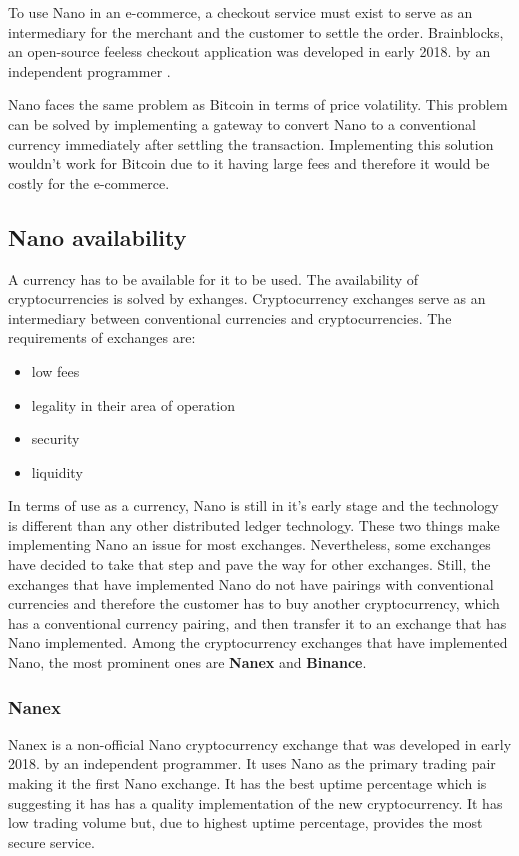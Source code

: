 \documentclass{ferseminar}
\begin{document}
To use Nano in an e-commerce, a checkout service must exist to serve as an intermediary for the merchant and the customer to settle the order. Brainblocks, an open-source feeless checkout application was developed in early 2018. by an independent programmer \cite{Brainblocks}.

Nano faces the same problem as Bitcoin in terms of price volatility. This problem can be solved by implementing a gateway to convert Nano to a conventional currency immediately after settling the transaction. Implementing this solution wouldn't work for Bitcoin due to it having large fees and therefore it would be costly for the e-commerce. 
\subsection{Nano availability}

A currency has to be available for it to be used. The availability of cryptocurrencies is solved by exhanges. Cryptocurrency exchanges serve as an intermediary between conventional currencies and cryptocurrencies. The requirements of exchanges are:
\begin{itemize}
	\item low fees
	\item legality in their area of operation
	\item security
	\item liquidity
\end{itemize}

In terms of use as a currency, Nano is still in it's early stage and the technology is different than any other distributed ledger technology. These two things make implementing Nano an issue for most exchanges. Nevertheless, some exchanges have decided to take that step and pave the way for other exchanges. Still, the exchanges that have implemented Nano do not have pairings with conventional currencies and therefore the customer has to buy another cryptocurrency, which has a conventional currency pairing, and then transfer it to an exchange that has Nano implemented. Among the cryptocurrency exchanges that have implemented Nano, the most prominent ones are \textbf{Nanex} and \textbf{Binance}.

\subsubsection{Nanex}
Nanex is a non-official Nano cryptocurrency exchange that was developed in early 2018. by an independent programmer. It uses Nano as the primary trading pair making it the first Nano exchange. It has the best uptime percentage which is suggesting it has has a quality implementation of the new cryptocurrency. It has low trading volume but, due to highest uptime percentage, provides the most secure service.
\end{document}
